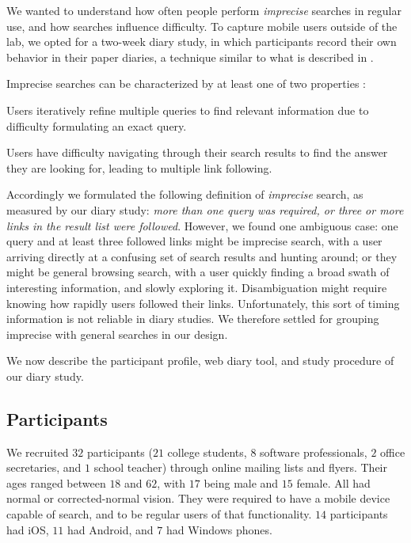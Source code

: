 We wanted to understand how often people perform \textit{imprecise} searches in regular use, and how searches influence difficulty. To capture mobile users outside of the lab, we opted for a two-week diary study, in which participants record their own behavior in their paper diaries, a technique similar to what is described in \cite{Sohn:2008}. 

 
Imprecise searches can be characterized by at least one of two properties \cite{Lee:2012}:
\begin{tight_enumerate}
\item Users iteratively refine multiple queries to find relevant information due to difficulty formulating an exact query. 
\item Users have difficulty navigating through their search results to find the answer they are looking for, leading to multiple link following.
\end{tight_enumerate}

Accordingly we formulated the following definition of \textit{imprecise} search, as measured by our diary study: \textit{more than one query was required, or three or more links in the result list were followed}. However, we found one ambiguous case: one query and at least three followed links might be imprecise search, with a user arriving directly at a confusing set of search results and hunting around; or they might be general browsing search, with a user quickly finding a broad swath of interesting information, and slowly exploring it. Disambiguation might require knowing how rapidly users followed their links. Unfortunately, this sort of timing information is not reliable in diary studies. We therefore settled for grouping imprecise with general searches in our design. 

We now describe the participant profile, web diary tool, and study procedure of our diary study.

\subsection{Participants}
We recruited $32$ participants ($21$ college students, $8$ software professionals, $2$ office secretaries, and $1$ school teacher) through online mailing lists and flyers. Their ages ranged between $18$ and $62$, with $17$ being male and $15$ female. All had normal or corrected-normal vision. They were required to have a mobile device capable of search, and to be regular users of that functionality. $14$ participants had iOS, $11$ had Android, and $7$ had Windows phones. 

